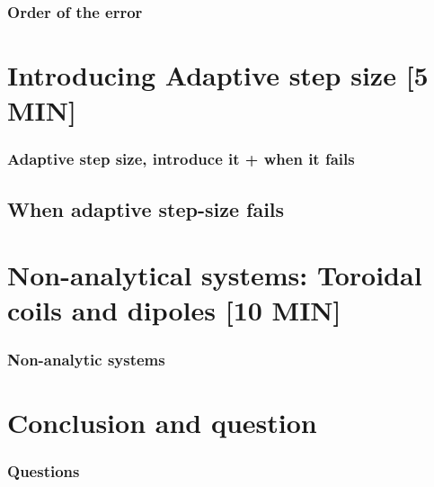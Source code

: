\documentclass{beamer}
\begin{document}
\begin{frame}
\frametitle{Order of the error}
%
\end{frame}
\section{Introducing Adaptive step size [5 MIN]}


\begin{frame}
\frametitle{Adaptive step size, introduce it + when it fails}
\end{frame}

\subsection{When adaptive step-size fails}

\section{Non-analytical systems: Toroidal coils and dipoles [10 MIN]}

\begin{frame}
\frametitle{Non-analytic systems}
\end{frame}

\section{Conclusion and question}

\begin{frame}
\frametitle{Questions}
\end{frame}


\end{document}

